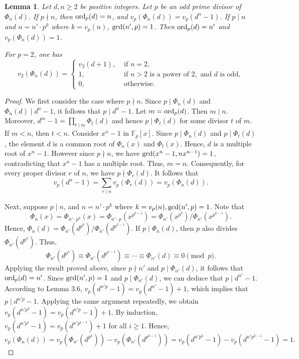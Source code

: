 \documentclass[10pt,leqno]{amsart}
\newtheorem{lemma}[theorem]{Lemma}
\theoremstyle{definition}
\theoremstyle{remark}
\numberwithin{equation}{section}
\def\ff{\mathbb{F}}
\def\gcd{{\rm gcd}}
\def\ord{{\rm ord}}
\begin{document}
\begin{lemma}
    Let $d,n\geq 2$ be positive integers. Let $p$ be an odd prime divisor of $\Phi_n(d)$. If $p\nmid n$, then $\ord_p(d) = n$, and $v_p(\Phi_n(d)) = v_p(d^n-1)$. If $p\mid n$ and $n = n'\cdot p^k$ where $k = v_p(n)$, $\gcd(n',p) = 1$. Then $\ord_p(d) = n'$ and $v_p(\Phi_n(d)) = 1$.

    For $p = 2$, one has
    $$v_2(\Phi_n(d)) = \begin{cases}
        v_2(d+1),&\text{ if }n = 2,\\
        1,&\text{ if }n>2\text{ is a power of }2,\text{ and }d\text{ is odd},\\
        0,&\text{ otherwise.}
    \end{cases}$$
\end{lemma}

\begin{proof}
    We first consider the case where $p\nmid n$. Since $p\mid \Phi_n(d)$ and $\Phi_n(d)\mid d^n-1$, it follows that $p\mid d^n-1$. Let $m = \ord_p(d)$. Then $m\mid n$. Moreover, $d^m-1 = \prod_{t\mid m}\Phi_t(d)$ and hence $p\mid \Phi_t(d)$ for some divisor $t$ of $m$. If $m<n$, then $t<n$. Consider $x^n-1$ in $\ff_p[x]$. Since $p\mid\Phi_n(d)$ and $p\mid \Phi_t(d)$, the element $d$ is a common root of $\Phi_n(x)$ and $\Phi_t(x)$. Hence, $d$ is a multiple root of $x^n-1$. However since $p\nmid n$, we have $\gcd(x^n-1,nx^{n-1}) = 1$, contradicting that $x^n-1$ has a multiple root. Thus, $m = n$. Consequently, for every proper divisor $r$ of $n$, we have $p\nmid\Phi_r(d)$. It follows that 
    $$v_p(d^n-1) = \sum_{r\mid n}v_p(\Phi_r(d)) = v_p(\Phi_n(d)).$$

    Next, suppose $p\mid n$, and $n = n'\cdot p^k$ where $k = v_p(n), \gcd(n',p) = 1$. Note that
    $$\Phi_n(x) = \Phi_{n'\cdot p^k}(x) = \Phi_{n'\cdot p}(x^{p^{k-1}}) = \Phi_{n'}(x^{p^k})/\Phi_{n'}(x^{p^{k-1}}).$$
    Hence, $\Phi_n(d) = \Phi_{n'}(d^{p^k})/\Phi_{n'}(d^{p^{k-1}})$. If $p\mid \Phi_n(d)$, then $p$ also divides $\Phi_{n'}(d^{p^k})$. Thus,
    $$\Phi_{n'}(d^{p^k})\equiv \Phi_{n'}(d^{p^{k-1}})\equiv \cdots\equiv \Phi_{n'}(d)\equiv 0\pmod p.$$
    Applying the result proved above, since $p\nmid n'$ and $p\mid \Phi_{n'}(d)$, it follows that $\ord_p(d) = n'$. Since $\gcd(n',p) = 1$ and $p\mid \Phi_{n'}(d)$, we can deduce that $p\mid d^{n'}-1$. According to Lemma 3.6, $v_p(d^{n'p}-1) = v_p(d^{n'}-1)+1$, which implies that $p\mid d^{n'p}-1$. Applying the same argument repeatedly, we obtain $v_{p}(d^{n'p^2}-1) = v_p(d^{n'p}-1)+1$. By induction, $v_p(d^{n'p^i}-1) = v_p(d^{n'p^{i-1}})+1$ for all $i\geq 1$. Hence,
    $$v_p(\Phi_n(d)) = v_p(\Phi_{n'}(d^{p^k}))-v_p(\Phi_{n'}(d^{p^{k-1}})) = v_p(d^{n'p^k}-1)-v_p(d^{n'p^{k-1}}-1) = 1.$$


\end{proof}
\end{document}
